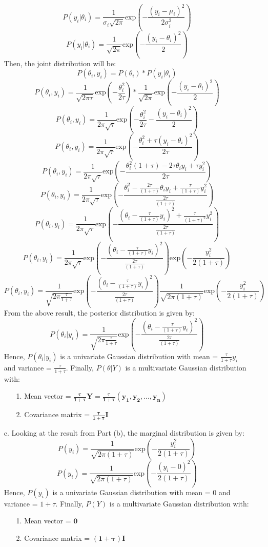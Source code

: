 \documentclass[twoside]{homework}
\begin{document}
\begin{itemize}
    $$P(y_i|\theta_i)=\frac{1}{\sigma_i\sqrt{2\pi}}\text{exp}(-\frac{(y_i-\mu_i)^2}{2\sigma_i^2})$$
    $$P(y_i|\theta_i)=\frac{1}{\sqrt{2\pi}}\text{exp}(-\frac{(y_i-\theta_i)^2}{2})$$
    Then, the joint distribution will be:
    $$P(\theta_i,y_i)={}P(\theta_i)*P(y_i|\theta_i)$$
    $$P(\theta_i,y_i)={}\frac{1}{\sqrt{2\pi\tau}}\text{exp}(-\frac{\theta_i^2}{2\tau})*\frac{1}{\sqrt{2\pi}}\text{exp}(-\frac{(y_i-\theta_i)^2}{2})$$
    $$P(\theta_i,y_i)={}\frac{1}{2\pi\sqrt{\tau}}\text{exp}(-\frac{\theta_i^2}{2\tau}-\frac{(y_i-\theta_i)^2}{2})$$
    $$P(\theta_i,y_i)={}\frac{1}{2\pi\sqrt{\tau}}\text{exp}(-\frac{\theta_i^2+\tau(y_i-\theta_i)^2}{2\tau})$$
    $$P(\theta_i,y_i)={}\frac{1}{2\pi\sqrt{\tau}}\text{exp}(-\frac{\theta_i^2(1+\tau)-2\tau\theta_iy_i+\tau{}y_i^2}{2\tau})$$
    $$P(\theta_i,y_i)={}\frac{1}{2\pi\sqrt{\tau}}\text{exp}(-\frac{\theta_i^2-\frac{2\tau}{(1+\tau)}\theta_iy_i+\frac{\tau}{(1+\tau)}y_i^2}{\frac{2\tau}{(1+\tau)}})$$
    $$P(\theta_i,y_i)={}\frac{1}{2\pi\sqrt{\tau}}\text{exp}(-\frac{(\theta_i-\frac{\tau}{(1+\tau)}y_i)^2+\frac{\tau}{(1+\tau)^2}y_i^2}{\frac{2\tau}{(1+\tau)}})$$
    $$P(\theta_i,y_i)={}\frac{1}{2\pi\sqrt{\tau}}\text{exp}(-\frac{(\theta_i-\frac{\tau}{(1+\tau)}y_i)^2}{\frac{2\tau}{(1+\tau)}})\text{exp}(-\frac{y_i^2}{2(1+\tau)})$$
    $$P(\theta_i,y_i)={}\frac{1}{\sqrt{2\pi\frac{\tau}{1+\tau}}}\text{exp}(-\frac{(\theta_i-\frac{\tau}{(1+\tau)}y_i)^2}{\frac{2\tau}{(1+\tau)}})\frac{1}{\sqrt{2\pi(1+\tau)}}\text{exp}(-\frac{y_i^2}{2(1+\tau)})$$
    From the above result, the posterior distribution is given by:
    $$P(\theta_i|y_i)=\frac{1}{\sqrt{2\pi\frac{\tau}{1+\tau}}}\text{exp}(-\frac{(\theta_i-\frac{\tau}{(1+\tau)}y_i)^2}{\frac{2\tau}{(1+\tau)}})$$
    Hence, $P(\theta_i|y_i)$ is a univariate Gaussian distribution with mean = $\frac{\tau}{1+\tau}y_i$ and variance = $\frac{\tau}{1+\tau}$. Finally, $P(\theta|Y)$ is a multivariate Gaussian distribution with:
    \begin{itemize}
        \item [1.] Mean vector = $\boldsymbol{\frac{\tau}{1+\tau}Y=\frac{\tau}{1+\tau}(y_1, y_2, ..., y_n)}$
        \item [2.] Covariance matrix = $\boldsymbol{\frac{\tau}{1+\tau}I}$
    \end{itemize}
    \newpage
    \item [c.] Looking at the result from Part (b), the marginal distribution is given by:
    $$P(y_i)=\frac{1}{\sqrt{2\pi(1+\tau)}}\text{exp}(-\frac{y_i^2}{2(1+\tau)})$$
    $$P(y_i)=\frac{1}{\sqrt{2\pi(1+\tau)}}\text{exp}(-\frac{(y_i-0)^2}{2(1+\tau)})$$
    Hence, $P(y_i)$ is a univariate Gaussian distribution with mean = $0$ and variance = $1+\tau$. Finally, $P(Y)$ is a multivariate Gaussian distribution with:
    \begin{itemize}
        \item [1.] Mean vector = $\boldsymbol{0}$
        \item [2.] Covariance matrix = $\boldsymbol{(1+\tau)I}$
    \end{itemize}
\end{itemize}
\end{document}
